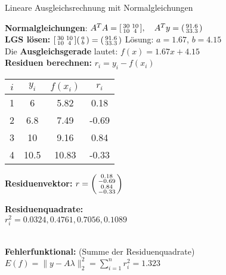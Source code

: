\begin{example2}{Lineare Ausgleichsrechnung mit Normalgleichungen}

\textbf{Normalgleichungen}:
$A^T A = \begin{bsmallmatrix} 30 & 10 \\ 10 & 4 \end{bsmallmatrix}, \quad A^T y = \begin{psmallmatrix} 91.6 \\ 33.3 \end{psmallmatrix}$
\vspace{1mm}\\
\textbf{LGS lösen:}
$\begin{bsmallmatrix} 30 & 10 \\ 10 & 4 \end{bsmallmatrix} \begin{psmallmatrix} a \\ b \end{psmallmatrix} = \begin{psmallmatrix} 91.6 \\ 33.3 \end{psmallmatrix}$
Lösung: $a = 1.67$, $b = 4.15$
\vspace{1mm}\\
Die \textbf{Ausgleichsgerade} lautet: $f(x) = 1.67x + 4.15$
\vspace{1mm}\\
\textbf{Residuen berechnen:} $r_i = y_i - f(x_i)$
\vspace{1mm}\\
\begin{minipage}{0.5\linewidth}
\begin{tabular}{|c|c|c|c|}
\hline
$i$ & $y_i$ & $f(x_i)$ & $r_i$\\
\hline
1 & 6 & 5.82 & 0.18\\
2 & 6.8 & 7.49 & -0.69\\
3 & 10 & 9.16 & 0.84 \\
4 & 10.5 & 10.83 & -0.33 \\
\hline
\end{tabular}
\end{minipage}
\begin{minipage}{0.5\linewidth}
\textbf{Residuenvektor:} $r = \begin{psmallmatrix} 0.18 \\ -0.69 \\ 0.84 \\ -0.33 \end{psmallmatrix}$

\textbf{Residuenquadrate:} \\ $r_i^2 = 0.0324, 0.4761, 0.7056, 0.1089$
\end{minipage}
\vspace{1mm}\\
\textbf{Fehlerfunktional:} (Summe der Residuenquadrate)
\vspace{1mm}\\
$E(f) = \|y - A\lambda\|_2^2 = \sum_{i=1}^{n} r_i^2 = 1.323$
\end{example2}



